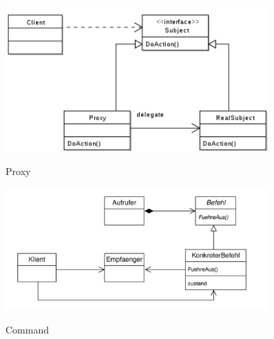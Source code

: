 \begin{figure}[htb]
    \centering
    \begin{minipage}[t]{0.45\linewidth}
		\centering
		\includegraphics[width=0.9\textwidth]{images/proxy}
		\label{fig:proxy}
		\caption{Proxy}
	\end{minipage}%
	\hfill
    \begin{minipage}[t]{0.45\linewidth}
		\centering
		\includegraphics[width=0.9\textwidth]{images/command}
		\label{fig:command}
		\caption{Command}
	\end{minipage}
\end{figure}

